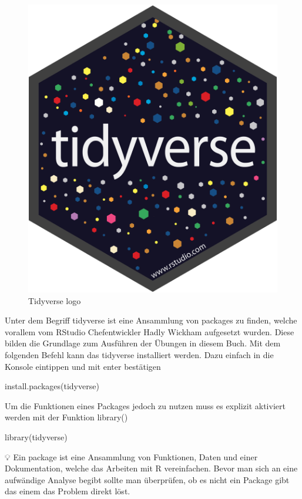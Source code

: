 \documentclass[
]{article}
\newenvironment{Shaded}{\begin{snugshade}}{\end{snugshade}}
\newcommand{\FunctionTok}[1]{\textcolor[rgb]{0.00,0.00,0.00}{#1}}
\newcommand{\NormalTok}[1]{#1}
\begin{document}
\begin{figure}

{\centering \includegraphics[width=0.5\linewidth]{images/006} 

}

\caption{Tidyverse logo}\label{fig:unnamed-chunk-9}
\end{figure}

Unter dem Begriff tidyverse ist eine Ansammlung von packages zu finden, welche vorallem vom RStudio Chefentwickler Hadly Wickham aufgesetzt wurden. Diese bilden die Grundlage zum Ausführen der Übungen in diesem Buch. Mit dem folgenden Befehl kann das tidyverse installiert werden. Dazu einfach in die Konsole eintippen und mit enter bestätigen

\begin{Shaded}
\begin{Highlighting}[]
\FunctionTok{install.packages}\NormalTok{(tidyverse)}
\end{Highlighting}
\end{Shaded}

Um die Funktionen eines Packages jedoch zu nutzen muss es explizit aktiviert werden mit der Funktion library()

\begin{Shaded}
\begin{Highlighting}[]
\FunctionTok{library}\NormalTok{(tidyverse)}
\end{Highlighting}
\end{Shaded}

💡 Ein package ist eine Ansammlung von Funktionen, Daten und einer Dokumentation, welche das Arbeiten mit R vereinfachen. Bevor man sich an eine aufwändige Analyse begibt sollte man überprüfen, ob es nicht ein Package gibt das einem das Problem direkt löst.
\end{document}
